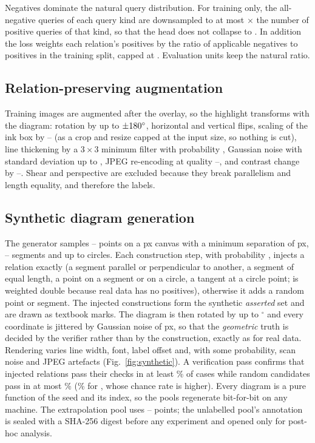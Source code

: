 Negatives dominate the natural query distribution. For training only, the all-negative queries of each query kind are downsampled to at most \noneRatio$\times$ the number of positive queries of that kind, so that the head does not collapse to . In addition the loss weights each relation's positives by the ratio of applicable negatives to positives in the training split, capped at \posWeightCap{}. Evaluation units keep the natural ratio.

\subsection{Relation-preserving augmentation}

Training images are augmented after the overlay, so the highlight transforms with the diagram: rotation by up to $\pm180^\circ$, horizontal and vertical flips, scaling of the ink box by \augScaleMin--\augScaleMax{} (as a crop and resize capped at the input size, so nothing is cut), line thickening by a $3\times3$ minimum filter with probability \augThickenProb, Gaussian noise with standard deviation up to \augNoiseStdMax, JPEG re-encoding at quality \augJpegMin--\augJpegMax, and contrast change by \augContrastMin--\augContrastMax. Shear and perspective are excluded because they break parallelism and length equality, and therefore the labels.

\subsection{Synthetic diagram generation}

The generator samples \synthPointsMin--\synthPointsMax{} points on a \synthCanvasPx{} px canvas with a minimum separation of \synthMinSeparationPx{} px, \synthSegmentsMin--\synthSegmentsMax{} segments and up to \synthCirclesMax{} circles. Each construction step, with probability \synthInjectRate, injects a relation exactly (a segment parallel or perpendicular to another, a segment of equal length, a point on a segment or on a circle, a tangent at a circle point;  is weighted double because real data has no positives), otherwise it adds a random point or segment. The injected constructions form the synthetic \emph{asserted} set and are drawn as textbook marks. The diagram is then rotated by up to \synthRotationDeg$^\circ$ and every coordinate is jittered by Gaussian noise of \synthJitterPx{} px, so that the \emph{geometric} truth is decided by the verifier rather than by the construction, exactly as for real data. Rendering varies line width, font, label offset and, with some probability, scan noise and JPEG artefacts (Fig.~\ref{fig:synthetic}). A verification pass confirms that injected relations pass their checks in at least \synthInjectedPassMinPct\% of cases while random candidates pass in at most \synthRandomPassMaxPct\% (\synthRandomPassEqualLengthPct\% for , whose chance rate is higher). Every diagram is a pure function of the seed and its index, so the pools regenerate bit-for-bit on any machine. The extrapolation pool uses \synthExtrapPointsMin--\synthExtrapPointsMax{} points; the unlabelled pool's annotation is sealed with a SHA-256 digest before any experiment and opened only for post-hoc analysis.

